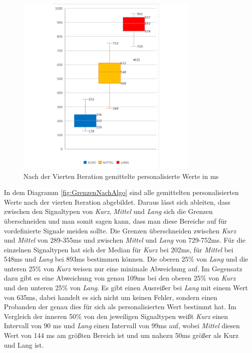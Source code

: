 \begin{figure}[htbp] 
            \centering
   	\includegraphics[width=0.8\textwidth]{pics/analyse/algo/MinMax/GrenzenNachAlgo.png}
	\caption{Nach der Vierten Iteration gemittelte personalisierte Werte in ms}
	\label{fig:GrenzenNachAlgo}
\end{figure}

In dem Diagramm \autoref{fig:GrenzenNachAlgo} sind alle gemittelten personalisierten Werte nach der vierten Iteration abgebildet. 
Daraus l{\"a}sst sich ableiten, dass zwischen den Signaltypen von \textit{Kurz}, \textit{Mittel} und \textit{Lang} sich die Grenzen {\"u}berschneiden und man somit sagen kann, dass man diese Bereiche auf f{\"u}r vordefinierte Signale meiden sollte. 
Die Grenzen {\"u}berschneiden zwischen \textit{Kurz} und \textit{Mittel} von 289-355ms und zwischen \textit{Mittel} und \textit{Lang} von 729-752ms.
F{\"u}r die einzelnen Signaltypen hat sich der Median f{\"u}r \textit{Kurz} bei 202ms, f{\"u}r \textit{Mittel} bei 548ms und \textit{Lang} bei 893ms bestimmen k{\"o}nnen.
Die oberen 25\% von \textit{Lang} und die unteren 25\% von \textit{Kurz} weisen nur eine minimale Abweichung auf. 
Im Gegensatz dazu gibt es eine Abweichung von genau 109ms bei den oberen 25\% von \textit{Kurz} und den unteren 25\% von \textit{Lang}.
Es gibt einen Ausrei{\ss}er bei \textit{Lang} mit einem Wert von 635ms, dabei handelt es sich nicht um keinen Fehler, sondern einen Probanden der genau dies f{\"u}r sich als personalisierten Wert bestimmt hat.
Im Vergleich der inneren 50\% von den jeweiligen Signaltypen wei{\ss}t \textit{Kurz} einen Intervall von 90 ms und \textit{Lang} einen Intervall von 99ms auf, wobei \textit{Mittel} diesen Wert von 144 ms am gr{\"o}{\ss}ten Bereich ist und um nahezu 50ms gr{\"o}{\ss}er als Kurz und Lang ist. 


